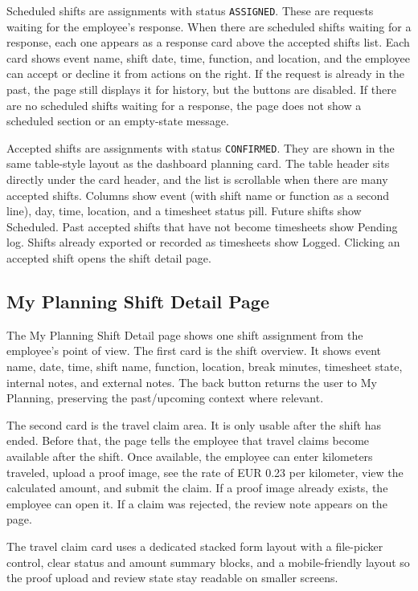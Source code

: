 \documentclass[11pt]{article}
\newcommand{\code}[1]{\nolinkurl{#1}}
\begin{document}
Scheduled shifts are assignments with status \code{ASSIGNED}. These are requests waiting for the employee's response. When there are scheduled shifts waiting for a response, each one appears as a response card above the accepted shifts list. Each card shows event name, shift date, time, function, and location, and the employee can accept or decline it from actions on the right. If the request is already in the past, the page still displays it for history, but the buttons are disabled. If there are no scheduled shifts waiting for a response, the page does not show a scheduled section or an empty-state message.

Accepted shifts are assignments with status \code{CONFIRMED}. They are shown in the same table-style layout as the dashboard planning card. The table header sits directly under the card header, and the list is scrollable when there are many accepted shifts. Columns show event (with shift name or function as a second line), day, time, location, and a timesheet status pill. Future shifts show Scheduled. Past accepted shifts that have not become timesheets show Pending log. Shifts already exported or recorded as timesheets show Logged. Clicking an accepted shift opens the shift detail page.

\subsection{My Planning Shift Detail Page}

The My Planning Shift Detail page shows one shift assignment from the employee's point of view. The first card is the shift overview. It shows event name, date, time, shift name, function, location, break minutes, timesheet state, internal notes, and external notes. The back button returns the user to My Planning, preserving the past/upcoming context where relevant.

The second card is the travel claim area. It is only usable after the shift has ended. Before that, the page tells the employee that travel claims become available after the shift. Once available, the employee can enter kilometers traveled, upload a proof image, see the rate of EUR 0.23 per kilometer, view the calculated amount, and submit the claim. If a proof image already exists, the employee can open it. If a claim was rejected, the review note appears on the page.

The travel claim card uses a dedicated stacked form layout with a file-picker control, clear status and amount summary blocks, and a mobile-friendly layout so the proof upload and review state stay readable on smaller screens.
\end{document}
